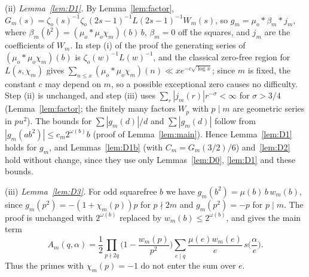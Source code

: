 \documentclass[11pt]{amsart}
\theoremstyle{remark}
\newcommand{\zo}{\zeta_{o}}
\begin{document}
(ii) \emph{Lemma~\ref{lem:D1}.} By Lemma~\ref{lem:factor}, $G_m(s)=\zo(s)^{-1}\zo(2s-1)^{-1}L(2s-1)^{-1}W_m(s)$, so $g_m=\mu_o*\beta_m*j_m$, where $\beta_m(b^2)=(\mu_o*\mu_o\chi_m)(b)\,b$, $\beta_m=0$ off the squares, and $j_m$ are the coefficients of $W_m$. In step (i) of the proof the generating series of $(\mu_o*\mu_o\chi_m)(b)$ is $\zo(w)^{-1}L(w)^{-1}$, and the classical zero-free region for $L(s,\chi_m)$ \cite[Ch.~11]{MVb} gives $\sum_{n\le x}(\mu_o*\mu_o\chi_m)(n)\ll xe^{-c\sqrt{\log x}}$; since $m$ is fixed, the constant $c$ may depend on $m$, so a possible exceptional zero causes no difficulty. Step (ii) is unchanged, and step (iii) uses $\sum_r|j_m(r)|r^{-\sigma}<\infty$ for $\sigma>3/4$ (Lemma~\ref{lem:factor}; the finitely many factors $W_p$ with $p\mid m$ are geometric series in $pu^2$). The bounds for $\sum|g_m(d)|/d$ and $\sum|g_m(d)|$ follow from $|g_m(ab^2)|\le c_m2^{\omega(b)}b$ (proof of Lemma~\ref{lem:main}). Hence Lemma~\ref{lem:D1} holds for $g_m$, and Lemmas~\ref{lem:D1b} (with $C_m=G_m(3/2)/6$) and~\ref{lem:D2} hold without change, since they use only Lemmas~\ref{lem:D0}, \ref{lem:D1} and these bounds.

(iii) \emph{Lemma~\ref{lem:D3}.} For odd squarefree $b$ we have $g_m(b^2)=\mu(b)\,b\,w_m(b)$, since $g_m(p^2)=-(1+\chi_m(p))p$ for $p\nmid2m$ and $g_m(p^2)=-p$ for $p\mid m$. The proof is unchanged with $2^{\omega(b)}$ replaced by $w_m(b)\le2^{\omega(b)}$, and gives the main term
\[
A_m(q,\alpha)=\frac12\prod_{p\nmid2q}\Big(1-\frac{w_m(p)}{p^2}\Big)\sum_{e\mid q}\frac{\mu(e)w_m(e)}e\,s\Big(\frac\alpha e\Big).
\]
Thus the primes with $\chi_m(p)=-1$ do not enter the sum over $e$.
\end{document}
